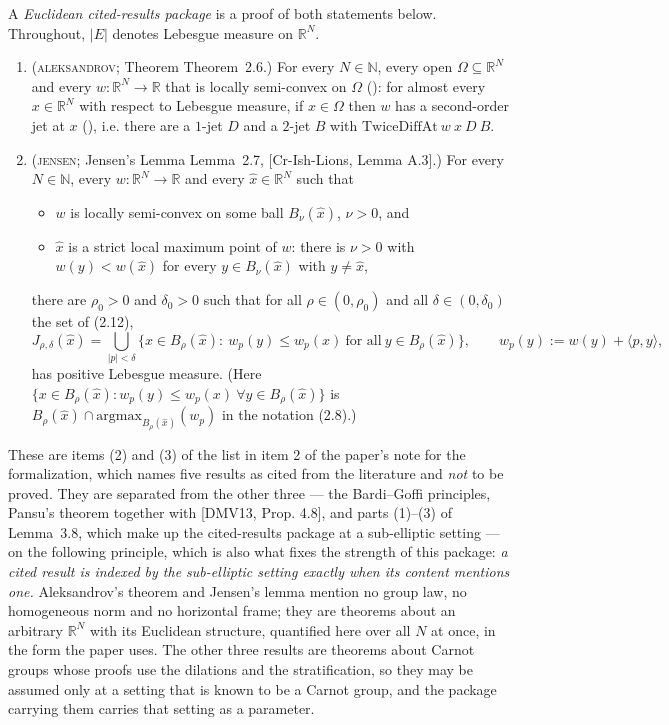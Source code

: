 \begin{definition}
A \emph{Euclidean cited-results package} is a proof of both statements below. Throughout,
$|E|$ denotes Lebesgue measure on $\mathbb R^{N}$.

\begin{enumerate}
\item (\textsc{aleksandrov}; Theorem Theorem~2.6.) For every $N\in\mathbb N$, every open
  $\Omega\subseteq\mathbb R^{N}$ and every $w:\mathbb R^{N}\to\mathbb R$ that is locally
  semi-convex on $\Omega$ (): for almost every
  $x\in\mathbb R^{N}$ with respect to Lebesgue measure, if $x\in\Omega$ then $w$ has a
  second-order jet at $x$ (), i.e. there are a $1$-jet $D$ and a
  $2$-jet $B$ with $\mathrm{TwiceDiffAt}\ w\ x\ D\ B$.

\item (\textsc{jensen}; Jensen's Lemma Lemma~2.7, [Cr-Ish-Lions, Lemma A.3].) For
  every $N\in\mathbb N$, every $w:\mathbb R^{N}\to\mathbb R$ and every
  $\hat x\in\mathbb R^{N}$ such that
  \begin{itemize}
  \item $w$ is locally semi-convex on some ball $B_\nu(\hat x)$, $\nu>0$, and
  \item $\hat x$ is a strict local maximum point of $w$: there is $\nu>0$ with
    $w(y)<w(\hat x)$ for every $y\in B_\nu(\hat x)$ with $y\ne\hat x$,
  \end{itemize}
  there are $\rho_0>0$ and $\delta_0>0$ such that for all $\rho\in(0,\rho_0)$ and all
  $\delta\in(0,\delta_0)$ the set of (2.12),
  \[
   J_{\rho,\delta}(\hat x)=\bigcup_{|p|<\delta}\Big\{x\in B_\rho(\hat x):\
     w_p(y)\le w_p(x)\ \text{for all}\ y\in B_\rho(\hat x)\Big\},
   \qquad w_p(y):=w(y)+\langle p,y\rangle ,
  \]
  has positive Lebesgue measure. (Here $\{x\in B_\rho(\hat x): w_p(y)\le w_p(x)\ \forall
  y\in B_\rho(\hat x)\}$ is $B_\rho(\hat x)\cap\mathrm{argmax}_{B_\rho(\hat x)}(w_p)$ in the
  notation (2.8).)
\end{enumerate}

These are items (2) and (3) of the list in item 2 of the paper's note for the formalization,
which names five results as cited from the literature and \emph{not} to be proved. They are
separated from the other three --- the Bardi--Goffi principles, Pansu's theorem together with
[DMV13, Prop. 4.8], and parts (1)--(3) of Lemma~3.8, which make up the cited-results package
at a sub-elliptic setting --- on the following principle, which is also what fixes the strength
of this package: \emph{a cited result is indexed by the sub-elliptic setting exactly when its
content mentions one.} Aleksandrov's theorem and Jensen's lemma mention no group law, no
homogeneous norm and no horizontal frame; they are theorems about an arbitrary
$\mathbb R^{N}$ with its Euclidean structure, quantified here over all $N$ at once, in the
form the paper uses. The other three results are theorems about Carnot groups whose proofs
use the dilations and the stratification, so they may be assumed only at a setting that is
known to be a Carnot group, and the package carrying them carries that setting as a
parameter.


\end{definition}
